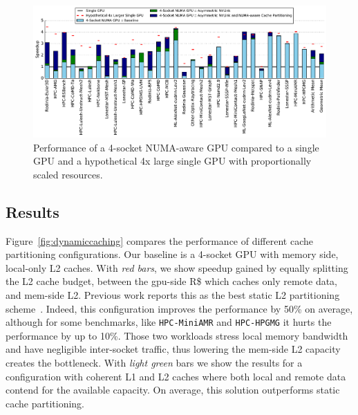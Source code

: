 \begin{figure}[tp]
    \centering
    \includegraphics[width=1.0\textwidth]{figures/plot_final_speedup_WB_nvlink_first.pdf}
    \caption{Performance of a 4-socket NUMA-aware GPU compared to a single GPU and a hypothetical 4x large single GPU with proportionally scaled resources.}
    \label{fig:combined}
    \vspace{-.2in}
\end{figure}

\subsection{Results}

Figure~\ref{fig:dynamiccaching} compares the performance of different cache 
partitioning configurations. Our baseline is a 4-socket GPU with memory side, 
local-only L2 caches. With \emph{red bars}, we show speedup gained by equally 
splitting the L2 cache budget, between the gpu-side R\$ which caches only 
remote data, and mem-side L2. Previous work reports this as the best static 
L2 partitioning scheme~\cite{Arunkumar2017}. Indeed, this configuration 
improves the performance by 50\% on average, although for some benchmarks, 
like \texttt{HPC-MiniAMR} and \texttt{HPC-HPGMG} it hurts the performance by 
up to 10\%. Those two workloads stress local memory bandwidth and have negligible 
inter-socket traffic, thus lowering the mem-side L2 capacity creates the 
bottleneck. With \emph{light green} bars we show the results for a configuration with 
coherent L1 and L2 caches where both local and remote data contend for the 
available capacity. On average, this solution outperforms static cache 
partitioning.

